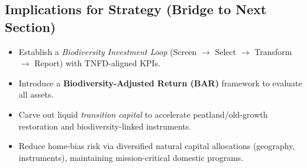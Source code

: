 \subsection*{Implications for Strategy (Bridge to Next Section)}
\begin{itemize}[leftmargin=*, itemsep=2pt]
    \item Establish a \emph{Biodiversity Investment Loop} (Screen $\rightarrow$ Select $\rightarrow$ Transform $\rightarrow$ Report) with TNFD-aligned KPIs.
    \item Introduce a \textbf{Biodiversity-Adjusted Return (BAR)} framework to evaluate all assets.
    \item Carve out liquid \emph{transition capital} to accelerate peatland/old-growth restoration and biodiversity-linked instruments.
    \item Reduce home-bias risk via diversified natural capital allocations (geography, instruments), maintaining mission-critical domestic programs.
\end{itemize}

